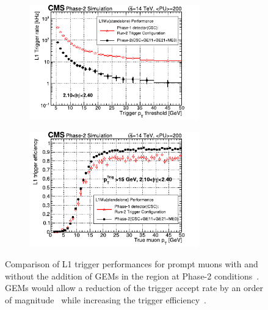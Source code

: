 	\begin{figure}[H]
		\begin{subfigure}{0.5\linewidth}
			\centering
			\includegraphics[height=5cm]{fig/chapt4/GEM-trigger-rate.pdf}
			\caption{\label{fig:CSC-GEM-perf:A}}
		\end{subfigure}
		\begin{subfigure}{0.5\linewidth}
			\centering
			\includegraphics[height=5cm]{fig/chapt4/GEM-trigger-eff.pdf}
			\caption{\label{fig:CSC-GEM-perf:B}}
		\end{subfigure}
		\caption{\label{fig:CSC-GEM-perf} Comparison of L1 trigger performances for prompt muons with and without the addition of GEMs in the region  at Phase-2 conditions~\cite{PHASEIITP}. GEMs would allow a reduction of the trigger accept rate by an order of magnitude~ while increasing the trigger efficiency~.}
	\end{figure}
	
